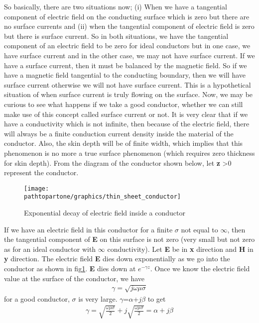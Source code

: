 So basically, there are two situations now; (i) When we have a tangential component of electric field on the conducting surface which is zero but there are no surface currents and (ii) when the tangential component of electric field is zero but there is surface current. So in both situations, we have the tangential component of an electric field to be zero for ideal conductors but in one case, we have surface current and in the other case, we may not have surface current. If we have a surface current, then it must be balanced by the magnetic field. So if we have a magnetic field tangential to the conducting boundary, then we will have surface current otherwise we will not have surface current. This is a hypothetical situation of when surface current is truly flowing on the surface. Now, we may be curious to see what happens if we take a good conductor, whether we can still make use of this concept called surface current or not. It is very clear that if we have a conductivity which is not infinite, then because of the electric field, there will always be a finite conduction current density inside the material of the conductor. Also, the skin depth will be of finite width, which implies that this phenomenon is no more a true surface phenomenon (which requires zero thickness for skin depth). From the diagram of the conductor shown below, let \textbf{z} \textgreater 0 represent the conductor.
\begin{figure}[h]
\centering
\texttt{[image: \\pathtopartone/graphics/thin\_sheet\_conductor]}
\caption{Exponential decay of electric field inside a conductor}
\label{fig:exponential_decay_of_E_in_conductor}
\end{figure}	

If we have an electric field in this conductor for a finite $\sigma$ not equal to $\infty$, then the tangential component of \textbf{E} on this surface is not zero (very small but not zero as for an ideal conductor with $\infty$ conductivity). Let \textbf{E} be in \textbf{x} direction and \textbf{H} in \textbf{y} direction. The electric field \textbf{E} dies down exponentially as we go into the conductor as shown in fig\ref{fig:exponential_decay_of_E_in_conductor}. \textbf{E} dies down at $e^{-\gamma z}$. Once we know the electric field value at the surface of the conductor, we have
\begin{align}
\gamma=\sqrt{\textit{j}\omega\mu\sigma}
\end{align}
for a good conductor, $\sigma$ is very large. $\gamma$=$\alpha$+$j\beta$ to get
\begin{align}
\gamma=\sqrt{\frac{\omega\mu\sigma}{2}}+\textit{j}\sqrt{\frac{\omega\mu\sigma}{2}}=\alpha+\textit{j}\beta
\end{align}

